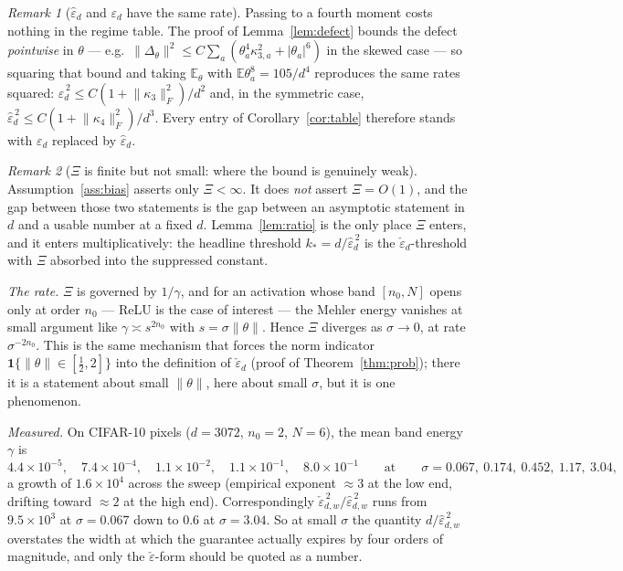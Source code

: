 \documentclass[11pt]{article}
\theoremstyle{remark}
\newtheorem{remark}{Remark}
\newcommand{\E}{\mathbb{E}}
\newcommand{\Fro}[1]{\lVert #1 \rVert_F}
\begin{document}
\begin{remark}[$\hat\varepsilon_d$ and $\varepsilon_d$ have the same rate]\label{rem:fourth}
Passing to a fourth moment costs nothing in the regime table. The proof of Lemma~\ref{lem:defect} bounds the defect \emph{pointwise} in $\theta$ --- e.g.\ $\lVert\Delta_\theta\rVert^2 \le C\sum_a(\theta_a^4\kappa_{3,a}^2 + |\theta_a|^6)$ in the skewed case --- so squaring that bound and taking $\E_\theta$ with $\E\theta_a^8 = 105/d^4$ reproduces the same rates squared: $\hat\varepsilon_d^{\,2} \le C(1+\Fro{\kappa_3}^2)/d^2$ and, in the symmetric case, $\hat\varepsilon_d^{\,2} \le C(1+\Fro{\kappa_4}^2)/d^3$. Every entry of Corollary~\ref{cor:table} therefore stands with $\varepsilon_d$ replaced by $\hat\varepsilon_d$.
\end{remark}

\begin{remark}[$\Xi$ is finite but not small: where the bound is genuinely weak]\label{rem:xi-sigma}
Assumption~\ref{ass:bias} asserts only $\Xi < \infty$. It does \emph{not} assert $\Xi = O(1)$, and the gap between those two statements is the gap between an asymptotic statement in $d$ and a usable number at a fixed $d$. Lemma~\ref{lem:ratio} is the only place $\Xi$ enters, and it enters multiplicatively: the headline threshold $k_* = d/\hat\varepsilon_d^{\,2}$ is the $\check\varepsilon_d$-threshold with $\Xi$ absorbed into the suppressed constant.

\emph{The rate.} $\Xi$ is governed by $1/\gamma$, and for an activation whose band $[n_0,N]$ opens only at order $n_0$ --- ReLU is the case of interest --- the Mehler energy vanishes at small argument like $\gamma \asymp s^{2n_0}$ with $s = \sigma\lVert\theta\rVert$. Hence $\Xi$ diverges as $\sigma \to 0$, at rate $\sigma^{-2n_0}$. This is the same mechanism that forces the norm indicator $\mathbf 1\{\lVert\theta\rVert\in[\frac12,2]\}$ into the definition of $\check\varepsilon_d$ (proof of Theorem~\ref{thm:prob}); there it is a statement about small $\lVert\theta\rVert$, here about small $\sigma$, but it is one phenomenon.

\emph{Measured.} On CIFAR-10 pixels ($d=3072$, $n_0=2$, $N=6$), the mean band energy $\gamma$ is
\[
4.4\times10^{-5},\quad 7.4\times10^{-4},\quad 1.1\times10^{-2},\quad 1.1\times10^{-1},\quad 8.0\times10^{-1}
\qquad\text{at}\qquad
\sigma = 0.067,\ 0.174,\ 0.452,\ 1.17,\ 3.04,
\]
a growth of $1.6\times10^4$ across the sweep (empirical exponent $\approx 3$ at the low end, drifting toward $\approx 2$ at the high end). Correspondingly $\check\varepsilon_{d,w}^{\,2}/\hat\varepsilon_{d,w}^{\,2}$ runs from $9.5\times10^{3}$ at $\sigma = 0.067$ down to $0.6$ at $\sigma = 3.04$. So at small $\sigma$ the quantity $d/\hat\varepsilon_{d,w}^{\,2}$ overstates the width at which the guarantee actually expires by four orders of magnitude, and only the $\check\varepsilon$-form should be quoted as a number.


\end{remark}
\end{document}
